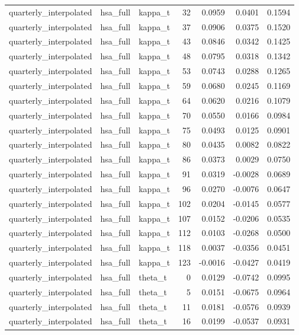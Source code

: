 \begin{tabular}{lllrrrr}
quarterly\_interpolated & hsa\_full & kappa\_t & 32 & 0.0959 & 0.0401 & 0.1594 \\
quarterly\_interpolated & hsa\_full & kappa\_t & 37 & 0.0906 & 0.0375 & 0.1520 \\
quarterly\_interpolated & hsa\_full & kappa\_t & 43 & 0.0846 & 0.0342 & 0.1425 \\
quarterly\_interpolated & hsa\_full & kappa\_t & 48 & 0.0795 & 0.0318 & 0.1342 \\
quarterly\_interpolated & hsa\_full & kappa\_t & 53 & 0.0743 & 0.0288 & 0.1265 \\
quarterly\_interpolated & hsa\_full & kappa\_t & 59 & 0.0680 & 0.0245 & 0.1169 \\
quarterly\_interpolated & hsa\_full & kappa\_t & 64 & 0.0620 & 0.0216 & 0.1079 \\
quarterly\_interpolated & hsa\_full & kappa\_t & 70 & 0.0550 & 0.0166 & 0.0984 \\
quarterly\_interpolated & hsa\_full & kappa\_t & 75 & 0.0493 & 0.0125 & 0.0901 \\
quarterly\_interpolated & hsa\_full & kappa\_t & 80 & 0.0435 & 0.0082 & 0.0822 \\
quarterly\_interpolated & hsa\_full & kappa\_t & 86 & 0.0373 & 0.0029 & 0.0750 \\
quarterly\_interpolated & hsa\_full & kappa\_t & 91 & 0.0319 & -0.0028 & 0.0689 \\
quarterly\_interpolated & hsa\_full & kappa\_t & 96 & 0.0270 & -0.0076 & 0.0647 \\
quarterly\_interpolated & hsa\_full & kappa\_t & 102 & 0.0204 & -0.0145 & 0.0577 \\
quarterly\_interpolated & hsa\_full & kappa\_t & 107 & 0.0152 & -0.0206 & 0.0535 \\
quarterly\_interpolated & hsa\_full & kappa\_t & 112 & 0.0103 & -0.0268 & 0.0500 \\
quarterly\_interpolated & hsa\_full & kappa\_t & 118 & 0.0037 & -0.0356 & 0.0451 \\
quarterly\_interpolated & hsa\_full & kappa\_t & 123 & -0.0016 & -0.0427 & 0.0419 \\
quarterly\_interpolated & hsa\_full & theta\_t & 0 & 0.0129 & -0.0742 & 0.0995 \\
quarterly\_interpolated & hsa\_full & theta\_t & 5 & 0.0151 & -0.0675 & 0.0964 \\
quarterly\_interpolated & hsa\_full & theta\_t & 11 & 0.0181 & -0.0576 & 0.0939 \\
quarterly\_interpolated & hsa\_full & theta\_t & 16 & 0.0199 & -0.0537 & 0.0931 \\

\end{tabular}

